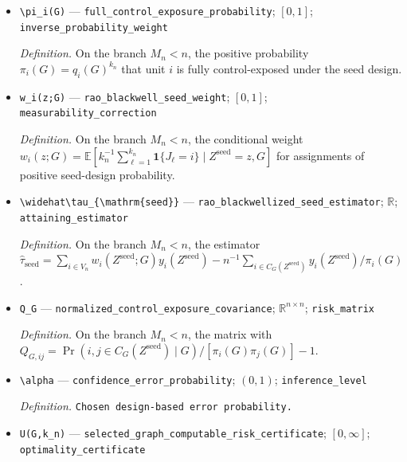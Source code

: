 \documentclass{article}
\begin{document}
\begin{itemize}
  \item \texttt{\textbackslash{}\allowbreak{}pi\_\allowbreak{}i(G)} --- \texttt{full\_\allowbreak{}control\_\allowbreak{}exposure\_\allowbreak{}probability}; \([0,1]\); \texttt{inverse\_\allowbreak{}probability\_\allowbreak{}weight}
  \par\smallskip\noindent\emph{Definition.} On the branch \(M_n<n\), the positive probability \(\pi_i(G)=q_i(G)^{k_n}\) that unit \(i\) is fully control-exposed under the seed design.
  \item \texttt{w\_\allowbreak{}i(z;\allowbreak{}G)} --- \texttt{rao\_\allowbreak{}blackwell\_\allowbreak{}seed\_\allowbreak{}weight}; \([0,1]\); \texttt{measurability\_\allowbreak{}correction}
  \par\smallskip\noindent\emph{Definition.} On the branch \(M_n<n\), the conditional weight \(w_i(z;G)=\mathbb E[k_n^{-1}\sum_{\ell=1}^{k_n}\mathbf 1\{J_\ell=i\}\mid Z^{\mathrm{seed}}=z,G]\) for assignments of positive seed-design probability.
  \item \texttt{\textbackslash{}\allowbreak{}widehat\textbackslash{}\allowbreak{}tau\_\allowbreak{}\{\textbackslash{}\allowbreak{}mathrm\{seed\}\allowbreak{}\}\allowbreak{}} --- \texttt{rao\_\allowbreak{}blackwellized\_\allowbreak{}seed\_\allowbreak{}estimator}; \(\mathbb R\); \texttt{attaining\_\allowbreak{}estimator}
  \par\smallskip\noindent\emph{Definition.} On the branch \(M_n<n\), the estimator \(\widehat\tau_{\mathrm{seed}}=\sum_{i\in V_n}w_i(Z^{\mathrm{seed}};G)y_i(Z^{\mathrm{seed}})-n^{-1}\sum_{i\in C_G(Z^{\mathrm{seed}})}y_i(Z^{\mathrm{seed}})/\pi_i(G)\).
  \item \texttt{Q\_\allowbreak{}G} --- \texttt{normalized\_\allowbreak{}control\_\allowbreak{}exposure\_\allowbreak{}covariance}; \(\mathbb R^{n\times n}\); \texttt{risk\_\allowbreak{}matrix}
  \par\smallskip\noindent\emph{Definition.} On the branch \(M_n<n\), the matrix with \(Q_{G,ij}=\Pr(i,j\in C_G(Z^{\mathrm{seed}})\mid G)/[\pi_i(G)\pi_j(G)]-1\).
  \item \texttt{\textbackslash{}\allowbreak{}alpha} --- \texttt{confidence\_\allowbreak{}error\_\allowbreak{}probability}; \((0,1)\); \texttt{inference\_\allowbreak{}level}
  \par\smallskip\noindent\emph{Definition.} \texttt{Chosen design-\allowbreak{}based error probability.}
  \item \texttt{U(G,\allowbreak{}k\_\allowbreak{}n)} --- \texttt{selected\_\allowbreak{}graph\_\allowbreak{}computable\_\allowbreak{}risk\_\allowbreak{}certificate}; \([0,\infty]\); \texttt{optimality\_\allowbreak{}certificate}

\end{itemize}
\end{document}
